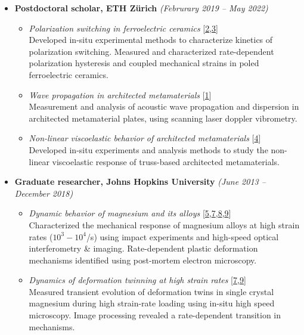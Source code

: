 \documentclass[a4paper,10pt, oneside]{article}
\begin{document}
\begin{itemize}[wide, labelwidth=!, labelindent=-1em]
\begin{itemize}[wide, labelwidth=!, labelindent=0em]
		\end{itemize}
		\vspace*{1em}
		\item[]\textbf{Postdoctoral scholar, ETH Z\"{u}rich} \hfill \textit{(Februrary 2019 -- May 2022)}
		\begin{itemize}[wide, labelwidth=!, labelindent=0em]
			\item \textit{Polarization switching in ferroelectric ceramics} [\hyperref[eml2022]{2},\hyperref[mat2022]{3}] \\
			Developed in-situ experimental methods to characterize kinetics of polarization switching. Measured and characterized rate-dependent polarization hysteresis and coupled mechanical strains in poled ferroelectric ceramics.
			\item \textit{Wave propagation in architected metamaterials} [\hyperref[jmps2024]{1}] \\
			Measurement and analysis of acoustic wave propagation and dispersion in architected metamaterial plates, using scanning laser doppler vibrometry.		
			\item \textit{Non-linear viscoelastic behavior of architected metamaterials} [\hyperref[jmps2021]{4}] \\
			Developed in-situ experiments and analysis methods to study the non-linear viscoelastic response of truss-based architected metamaterials.
		\end{itemize}
		\vspace*{1em}
		\item[]\textbf{Graduate researcher, Johns Hopkins University} \hfill \textit{(June 2013 -- December 2018)}
		\begin{itemize}[wide, labelwidth=!, labelindent=0em]
			\item \textit{Dynamic behavior of magnesium and its alloys} [\hyperref[jms2019]{5},\hyperref[jmps2018]{7},\hyperref[actmat2018]{8},\hyperref[jdbm2018]{9}]\\
			Characterized the mechanical response of magnesium alloys at high strain rates ($10^{3}-10^{4}$/s) using impact experiments and high-speed  optical interferometry \& imaging. Rate-dependent plastic deformation mechanisms identified using post-mortem electron microscopy. 
			
			\item \textit{Dynamics of deformation twinning at high strain rates} [\hyperref[jmps2018]{7},\hyperref[jdbm2018]{9}] \\
			Measured transient evolution of deformation twins in single crystal magnesium during high strain-rate loading using in-situ high speed microscopy. Image processing revealed a rate-dependent transition in mechanisms.
			

\end{itemize}
\end{itemize}
\end{document}
